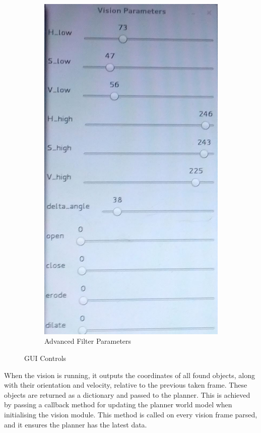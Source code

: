 \begin{figure}[H]
\begin{subfigure}{.5\textwidth}
\includegraphics[scale=0.2]{vision_params}
\caption{Advanced Filter Parameters}
\label{fig:params}
\end{subfigure}
\caption{GUI Controls}
\label{fig:sliders}
\end{figure}


When the vision is running, it outputs the coordinates of all found objects, along with their orientation and velocity, relative to the previous taken frame. These objects are returned as a dictionary and passed to the planner. This is achieved by passing a callback method for updating the planner world model when initialising the vision module. This method is called on every vision frame parsed, and it ensures the planner has the latest data.
